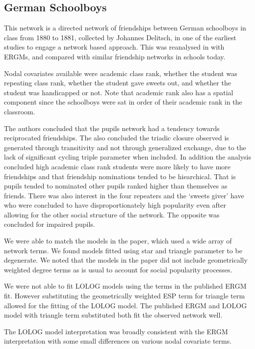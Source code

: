 \documentclass[
]{statsoc}
\begin{document}
\subsection{German Schoolboys}

This network is a directed network of friendships between German
schoolboys in class from 1880 to 1881, collected by Johannes Delitsch,
in one of the earliest studies to engage a network based approach. This
was reanalysed in \cite{Heidler2014} with ERGMs, and compared with
similar friendship networks in schools today.

Nodal covariates available were academic class rank, whether the student
was repeating class rank, whether the student gave sweets out, and
whether the student was handicapped or not. Note that academic rank also
has a spatial component since the schoolboys were sat in order of their
academic rank in the classroom.

The authors concluded that the pupils network had a tendency towards
reciprocated friendships. The also concluded the triadic closure
observed is generated through transitivity and not through generalized
exchange, due to the lack of significant cycling triple parameter when
included. In addition the analysis concluded high academic class rank
students were more likely to have more friendships and that friendship
nominations tended to be hiearchical. That is pupils tended to nominated
other pupils ranked higher than themselves as friends. There was also
interest in the four repeaters and the `sweets giver' have who were
concluded to have disproportionately high popularity even after allowing
for the other social structure of the network. The opposite was
concluded for impaired pupils.

We were able to match the models in the paper, which used a wide array
of network terms. We found models fitted using star and triangle
parameter to be degenerate. We noted that the models in the paper did
not include geometrically weighted degree terms as is usual to account
for social popularity processes.

We were not able to fit LOLOG models using the terms in the published
ERGM fit. However substituting the geometrically weighted ESP term for
triangle term allowed for the fitting of the LOLOG model. The published
ERGM and LOLOG model with triangle term substituted both fit the
observed network well.

The LOLOG model interpretation was broadly consistent with the ERGM
interpretation with some small differences on various nodal covariate
terms.
\end{document}
